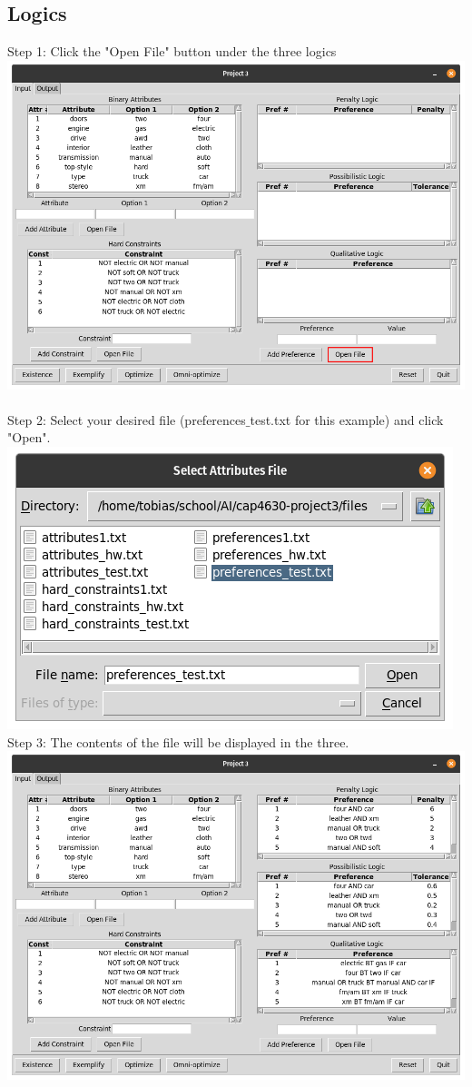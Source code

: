 \documentclass[titlepage]{article}
\begin{document}
\subsection{Logics}
Step 1: Click the "Open File" button under the three logics\\
\includegraphics[scale=0.3]{input_preferences} \\\\
Step 2: Select your desired file (preferences$\_$test.txt for this example) and click "Open".\\
\includegraphics[scale=0.3]{select_preferences}\\
Step 3: The contents of the file will be displayed in the three.\\
\includegraphics[scale=0.3]{preferences_imported}
\end{document}
